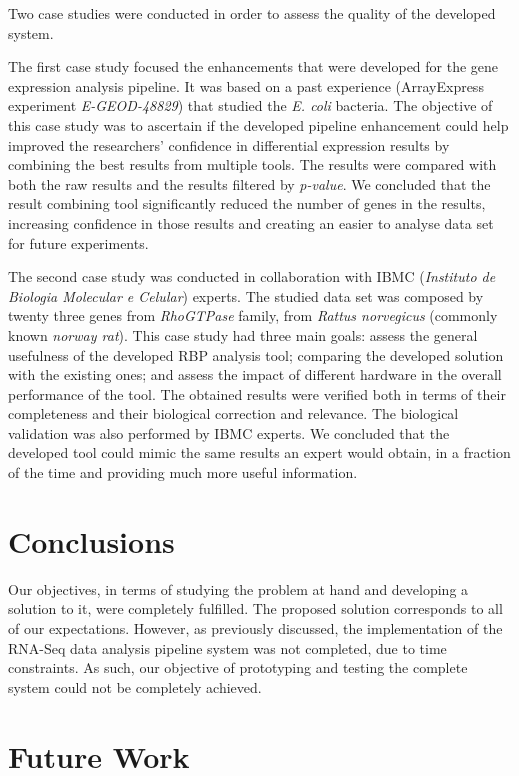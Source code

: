 \documentclass[9pt,a4paper]{extarticle}
\begin{document}
\begin{multicols}{2}
Two case studies were conducted in order to assess the quality of the developed
system.

The first case study focused the enhancements that were developed for the gene
expression analysis pipeline. It was based on a past experience (ArrayExpress
experiment \emph{E-GEOD-48829}) that studied the \emph{E. coli} bacteria. The
objective of this case study was to ascertain if the developed pipeline
enhancement could help improved the researchers' confidence in differential
expression results by combining the best results from multiple tools. The
results were compared with both the raw results and the results filtered by
\emph{p-value}. We concluded that the result combining tool significantly
reduced the number of genes in the results, increasing confidence in those
results and creating an easier to analyse data set for future experiments.

The second case study was conducted in collaboration with IBMC (\emph{Instituto
de Biologia Molecular e Celular}) experts. The studied data set was composed by
twenty three genes from \emph{RhoGTPase} family, from \emph{Rattus norvegicus}
(commonly known \emph{norway rat}). This case study had three main goals: assess
the general usefulness of the developed RBP analysis tool; comparing the
developed solution with the existing ones; and assess the impact of different
hardware in the overall performance of the tool. The obtained results were
verified both in terms of their completeness and their biological correction and
relevance. The biological validation was also performed by IBMC experts. We
concluded that the developed tool could mimic the same results an expert would
obtain, in a fraction of the time and providing much more useful information.

\section{Conclusions}

Our objectives, in terms of studying the problem at hand and developing a
solution to it, were completely fulfilled. The proposed solution corresponds to
all of our expectations. However, as previously discussed, the implementation of
the RNA-Seq data analysis pipeline system was not completed, due to time
constraints. As such, our objective of prototyping and testing the complete
system could not be completely achieved.

\section{Future Work}


\end{multicols}
\end{document}
